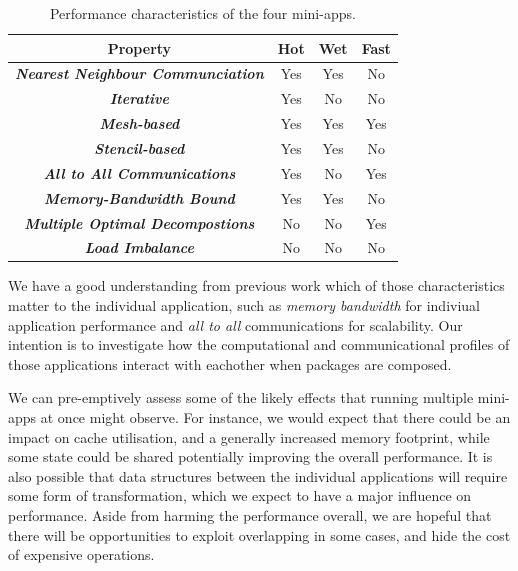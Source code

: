 \documentclass[runningheads,a4paper]{llncs}
\begin{document}
\begin{table}[h]
  \begin{center}
    \begin{tabular}{cccc}
      \hline
      \textbf{Property} & \textbf{Hot} & \textbf{Wet} & \textbf{Fast} \\
      \hline
      \textit{\textbf{Nearest Neighbour Communciation}} & Yes & Yes & No  \\
      \textit{\textbf{Iterative}} & Yes & No & No \\
      \textit{\textbf{Mesh-based}} & Yes & Yes & Yes \\
      \textit{\textbf{Stencil-based}} & Yes & Yes & No \\
      \textit{\textbf{All to All Communications}} & Yes & No & Yes \\
      \textit{\textbf{Memory-Bandwidth Bound}} & Yes & Yes & No \\
      \textit{\textbf{Multiple Optimal Decompostions}} & No & No & Yes \\
      \textit{\textbf{Load Imbalance}} & No & No & No \\
    \end{tabular}
  \end{center}
  \caption{Performance characteristics of the four mini-apps.}
  \label{tab:perf-char-mini-apps}
\end{table}

We have a good understanding from previous work which of those characteristics matter to the individual application, such as \textit{memory bandwidth} for indiviual application performance and \textit{all to all} communications for scalability. Our intention is to investigate how the computational and communicational profiles of those applications interact with eachother when packages are composed.

We can pre-emptively assess some of the likely effects that running multiple mini-apps at once might observe. For instance, we would expect that there could be an impact on cache utilisation, and a generally increased memory footprint, while some state could be shared potentially improving the overall performance. It is also possible that data structures between the individual applications will require some form of transformation, which we expect to have a major influence on performance. Aside from harming the performance overall, we are hopeful that there will be opportunities to exploit overlapping in some cases, and hide the cost of expensive operations.
\end{document}
